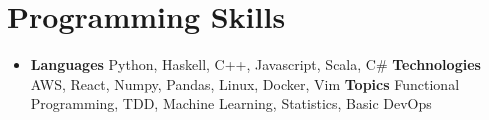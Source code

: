 \documentclass[letterpaper,11pt]{article}
\newcommand{\resumeSubHeadingListStart}{\begin{itemize}[leftmargin=*]}
\newcommand{\resumeSubHeadingListEnd}{\end{itemize}}
\begin{document}
%
\section{Programming Skills}
  \resumeSubHeadingListStart
    \item{
      \textbf{Languages}{ Python, Haskell, C++, Javascript, Scala, C# }
      \hfill
      \textbf{Technologies}{ AWS, React, Numpy, Pandas, Linux, Docker, Vim }
      \hfill
      \textbf{Topics}{ Functional Programming, TDD, Machine Learning, Statistics, Basic DevOps }
    }
  \resumeSubHeadingListEnd


\end{document}
